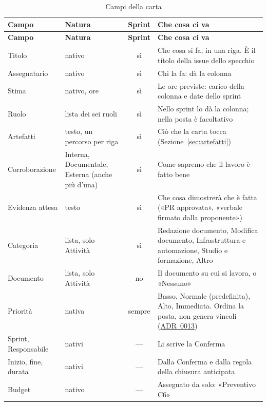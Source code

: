 \documentclass[a4paper, 11pt]{article}
\newcommand{\adr}[1]{\hyperref[adr:#1]{ADR~#1}}
\begin{document}
\begin{xltabular}{\textwidth}{@{} >{\raggedright\arraybackslash}p{0.2\textwidth} >{\raggedright\arraybackslash}p{0.2\textwidth} c X @{}}
\caption{Campi della carta}\label{tab:campi}\\
\toprule
\textbf{Campo} & \textbf{Natura} & \textbf{Sprint} & \textbf{Che cosa ci va} \\
\midrule
\endfirsthead
\toprule
\textbf{Campo} & \textbf{Natura} & \textbf{Sprint} & \textbf{Che cosa ci va} \\
\midrule
\endhead
Titolo & nativo & sì & Che cosa si fa, in una riga. È il titolo della issue dello specchio \\
Assegnatario & nativo & sì & Chi la fa: dà la colonna \\
Stima & nativo, ore & sì & Le ore previste: carico della colonna e date dello sprint \\
Ruolo & lista dei sei ruoli & sì & Nello sprint lo dà la colonna; nella posta è facoltativo \\
Artefatti & testo, un percorso per riga & sì & Ciò che la carta tocca (Sezione~\ref{sec:artefatti}) \\
Corroborazione & Interna, Documentale, Esterna (anche più d'una) & sì & Come sapremo che il lavoro è fatto bene \\
Evidenza attesa & testo & sì & Che cosa dimostrerà che è fatta («PR approvata», «verbale firmato dalla proponente») \\
Categoria & lista, solo Attività & sì & Redazione documento, Modifica documento, Infrastruttura e automazione, Studio e formazione, Altro \\
Documento & lista, solo Attività & no & Il documento su cui si lavora, o «Nessuno» \\
Priorità & nativa & sempre & Basso, Normale (predefinita), Alto, Immediata. Ordina la posta, non genera vincoli (\adr{0013}) \\
Sprint, Responsabile & nativi & --- & Li scrive la Conferma \\
Inizio, fine, durata & nativi & --- & Dalla Conferma e dalla regola della chiusura anticipata \\
Budget & nativo & --- & Assegnato da solo: «Preventivo C6» \\
\bottomrule
\end{xltabular}
\end{document}
